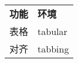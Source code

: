 \begin{tabular}{ll}
\bfseries 功能 & \bfseries 环境 \\
表格 & \ttfamily tabular \\
对齐 & \ttfamily tabbing \\
\end{tabular}
